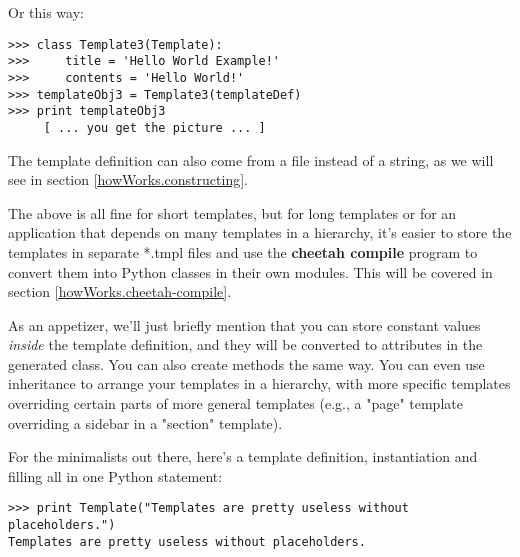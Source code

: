 Or this way:

\begin{verbatim}
>>> class Template3(Template):
>>>     title = 'Hello World Example!'
>>>     contents = 'Hello World!'
>>> templateObj3 = Template3(templateDef)
>>> print templateObj3
     [ ... you get the picture ... ]
\end{verbatim}

The template definition can also come from a file instead of a string,
as we will see in section \ref{howWorks.constructing}.

The above is all fine for short templates, but for long templates or
for an application that depends on many templates in a hierarchy, it's
easier to store the templates in separate *.tmpl files and use the
{\bf cheetah compile} program to convert them into Python classes in
their own modules.  This will be covered in section
\ref{howWorks.cheetah-compile}.  

As an appetizer, we'll just briefly mention that you can store constant values
{\em inside} the template definition, and they will be converted to attributes
in the generated class.  You can also create methods the same way.
You can even use inheritance to arrange your templates in a hierarchy,
with more specific templates overriding certain parts of more general
templates (e.g., a "page" template overriding a sidebar in a "section"
template).

For the minimalists out there, here's a template definition,
instantiation and filling all in one Python statement:

\begin{verbatim}
>>> print Template("Templates are pretty useless without placeholders.")
Templates are pretty useless without placeholders.
\end{verbatim}




